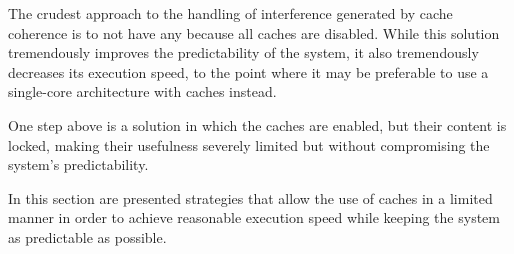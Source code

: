 The crudest approach to the handling of interference generated by cache
coherence is to not have any because all caches are disabled. While this
solution tremendously improves the predictability of the system, it also
tremendously decreases its execution speed, to the point where it may be
preferable to use a single-core architecture with caches instead.

One step above is a solution in which the caches are enabled, but their content
is locked, making their usefulness severely limited but without compromising the
system's predictability.

In this section are presented strategies that allow the use of caches in a
limited manner in order to achieve reasonable execution speed while keeping the
system as predictable as possible.
